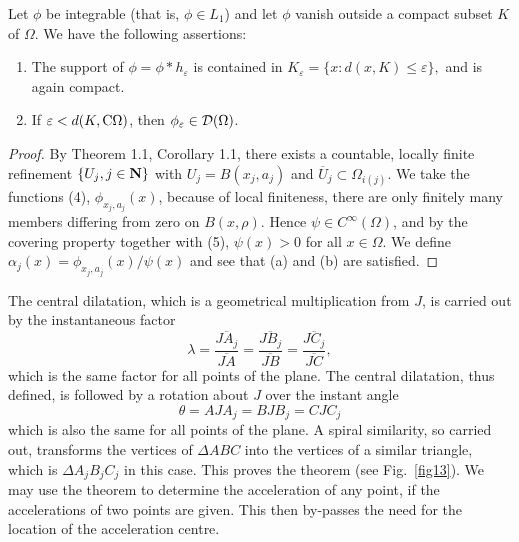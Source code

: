 \begin{theorem}
 Let $\phi$ be integrable (that is,
$\phi \in L_1$) and let $\phi$ vanish
outside a compact subset $ K $ of $\Omega$. We have the following
assertions:
\begin{enumerate}
 \renewcommand{\theenumi}{{\rm(\alph{enumi})}}
 \item
The support of $ \phi = \phi \ast h_\varepsilon $ is contained in
$ K_\varepsilon = \{ x : d(x, K) \leq \varepsilon \},$
 and is again compact.

 \item If $\varepsilon < d(K, {\rm C} \Omega)$,
 then $\phi_\varepsilon \in {\cal D\/}(\Omega)$.
\end{enumerate}
\end{theorem}
\begin{proof}
By Theorem 1.1, Corollary 1.1, there exists
a countable, locally finite refinement
$\{ U_j, j \in {\bf N} \}$ with
$U_j = B(x_j, a_j)$ and
$ \overline{U}_j \subset \Omega_{i(j)} $.
We take the functions (4),
$ \phi_{x_j, a_j}(x)$,
because of local finiteness,
there are only finitely many members differing from zero on $B(x, \rho)$.
Hence $\psi \in C^\infty(\Omega)$, and by the covering property together
with (5),
$\psi(x) > 0 $ for all $ x \in \Omega$.
 We define
$\alpha_j(x) = \phi_{x_j,a_j}(x)/\psi(x) $
and see that (a) and (b) are satisfied.
\end{proof}

The central dilatation, which is a geometrical multiplication from
$J$, is carried out by the instantaneous factor
\begin{displaymath}
\lambda = \frac{\overline{JA_j}}{\overline{JA}}
      = \frac{\overline{JB_j}}{\overline{JB}}
      = \frac{\overline{JC_j}}{\overline{JC}},
\end{displaymath}
which is the same factor for all points of the plane. The central
dilatation, thus defined, is followed by a rotation about $J$
over the instant angle
\begin{displaymath}
\theta = A J A_j
      = B J B_j
      = C J C_j
\end{displaymath}
which is also the same for all points of the plane. A spiral
similarity, so carried out, transforms the vertices of
$ \Delta A B C$
into the vertices of a similar triangle, which is
$  \Delta A_j B_j C_j$
in this case.
This proves the theorem (see Fig.~\ref{fig13}). We may use the theorem to
determine the acceleration of any point, if the accelerations of two
points are given. This then by-passes the need for the location of
the acceleration centre.

